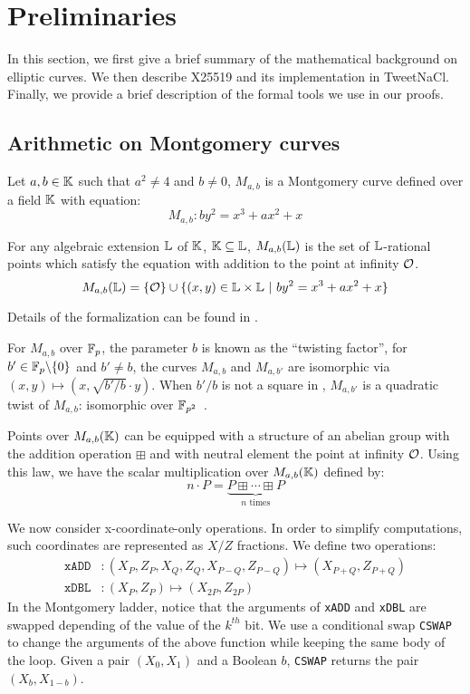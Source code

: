 \section{Preliminaries}
\label{sec:preliminaries}

In this section, we first give a brief summary of the mathematical background
on elliptic curves. We then describe X25519 and its implementation in TweetNaCl.
Finally, we provide a brief description of the formal tools we use in our proofs.

\subsection{Arithmetic on Montgomery curves}
\label{subsec:arithmetic-montgomery}

\begin{dfn}
  Let $a,b \in \mathbb{K}$ such that $a^2 \neq 4$ and $b \neq 0$, $M_{a,b}$ is a
  Montgomery curve defined over a field $\mathbb{K}$ with equation:
  $$M_{a,b}: by^2 = x^3 + ax^2 + x$$
\end{dfn}

\begin{dfn}
  For any algebraic extension $\mathbb{L}$ of $\mathbb{K}$, $\mathbb{K} \subseteq	\mathbb{L}$,
  $M_{a,b}(\mathbb{L})$ is the set of $\mathbb{L}$-rational points which satisfy the equation with
  addition to the point at infinity $\mathcal{O}$.
  $$M_{a,b}(\mathbb{L}) = \{\mathcal{O}\} \cup \{(x,y) \in \mathbb{L} \times \mathbb{L}~|~by^2 = x^3 + ax^2 + x\}$$
\end{dfn}
Details of the formalization can be found in .

\begin{dfn}
  For $M_{a,b}$ over $\mathbb{F}_{p}$, the parameter $b$ is known as the ``twisting factor'',
  for $b'\in \mathbb{F}_{p}\backslash\{0\}$ and $b' \neq b$, the curves $M_{a,b}$ and $M_{a,b'}$
  are isomorphic via $(x,y) \mapsto (x, \sqrt{b'/b} \cdot y)$.
  When $b'/b$ is not a square in , $M_{a,b'}$ is a quadratic twist of $M_{a,b}$:
  isomorphic over $\mathbb{F}_{p^2}$~\cite{cryptoeprint:2017:212}.
\end{dfn}

Points over $M_{a,b}(\mathbb{K})$ can be equipped with a structure of an abelian group
with the addition operation $\boxplus$ and with neutral element the point at infinity $\mathcal{O}$.
Using this law, we have the scalar multiplication over $M_{a,b}(\mathbb{K})$ defined by:
  $$n\cdot P = \underbrace{P \boxplus \cdots \boxplus P}_{n\text{ times}}$$

We now consider x-coordinate-only operations. In order to simplify computations,
such coordinates are represented as $X/Z$ fractions. We define two operations:
\begin{align*}
\texttt{xADD} &: (X_P, Z_P, X_Q , Z_Q, X_{P-Q}, Z_{P-Q}) \mapsto (X_{P+Q}, Z_{P+Q})\\
\texttt{xDBL} &: (X_P, Z_P) \mapsto (X_{2P}, Z_{2P})
\end{align*}
In the Montgomery ladder, notice that the arguments of \texttt{xADD} and \texttt{xDBL}
are swapped depending of the value of the $k^{th}$ bit. We use a conditional
swap \texttt{CSWAP} to change the arguments of the above function while keeping
the same body of the loop.
Given a pair $(X_0, X_1)$ and a Boolean $b$, \texttt{CSWAP} returns the pair
$(X_b, X_{1-b})$.

